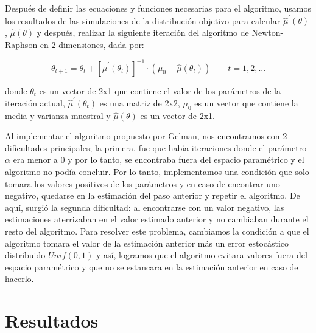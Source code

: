 \documentclass[9pt,twocolumn,twoside,]{pnas-new}
\begin{document}
Después de definir las ecuaciones y funciones necesarias para el
algoritmo, usamos los resultados de las simulaciones de la distribución
objetivo para calcular \(\hat{\mu}^{\prime}(\theta)\),
\(\hat{\mu}(\theta)\) y después, realizar la siguiente iteración del
algoritmo de Newton-Raphson en 2 dimensiones, dada por:

\[ \theta_{t+1} = \theta_t + [\hat{\mu}^{\prime}(\theta_t)]^{-1} \cdot (\mu_0 - \hat{\mu}(\theta_t)) \qquad t=1,2,... \]

donde \(\theta_t\) es un vector de 2x1 que contiene el valor de los
parámetros de la iteración actual, \(\hat{\mu}^{\prime}(\theta_t)\) es
una matriz de 2x2, \(\mu_0\) es un vector que contiene la media y
varianza muestral y \(\hat{\mu}(\theta)\) es un vector de 2x1.

Al implementar el algoritmo propuesto por Gelman, nos encontramos con 2
dificultades principales; la primera, fue que había iteraciones donde el
parámetro \(\alpha\) era menor a 0 y por lo tanto, se encontraba fuera
del espacio paramétrico y el algoritmo no podía concluir. Por lo tanto,
implementamos una condición que solo tomara los valores positivos de los
parámetros y en caso de encontrar uno negativo, quedarse en la
estimación del paso anterior y repetir el algoritmo. De aquí, surgió la
segunda dificultad: al encontrarse con un valor negativo, las
estimaciones aterrizaban en el valor estimado anterior y no cambiaban
durante el resto del algoritmo. Para resolver este problema, cambiamos
la condición a que el algoritmo tomara el valor de la estimación
anterior más un error estocástico distribuido \(Unif(0,1)\) y así,
logramos que el algoritmo evitara valores fuera del espacio paramétrico
y que no se estancara en la estimación anterior en caso de hacerlo.

\hypertarget{resultados}{%
\section*{Resultados}\label{resultados}}
\end{document}

